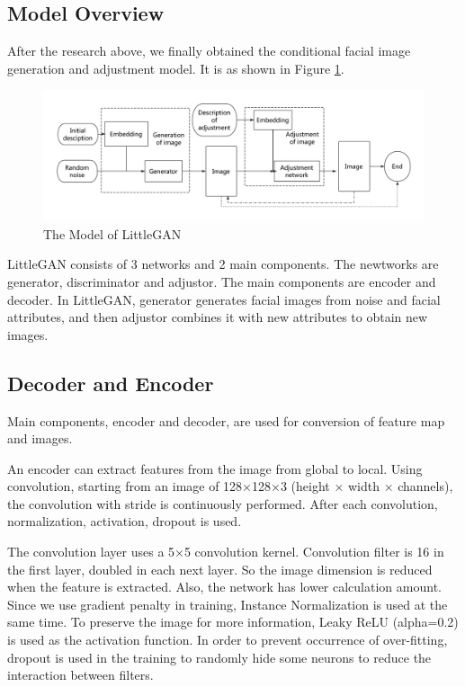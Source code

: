 \subsection{Model Overview}

After the research above, we finally obtained the conditional facial image generation and adjustment model.
It is as shown in Figure \ref{smliegan}.

\begin{figure}
    \begin{center}
    \includegraphics[width=\textwidth]{figures/model.pdf}
    \caption{The Model of LittleGAN}
    \label{smliegan}
    \end{center}
\end{figure}

LittleGAN consists of 3 networks and 2 main components.
The newtworks are generator, discriminator and adjustor.
The main components are encoder and decoder.
In LittleGAN, generator generates facial images from noise and facial attributes,
    and then adjustor combines it with new attributes to obtain new images.


\subsection{Decoder and Encoder}

Main components, encoder and decoder, are used for conversion of feature map and images.

An encoder can extract features from the image from global to local.
Using convolution, starting from an image of 128×128×3 (height × width × channels),
    the convolution with stride is continuously performed.
After each convolution, normalization, activation, dropout is used.

The convolution layer uses a 5×5 convolution kernel.
Convolution filter is 16 in the first layer, doubled in each next layer.
So the image dimension is reduced when the feature is extracted.
Also, the network has lower calculation amount.
Since we use gradient penalty in training,
    Instance Normalization is used at the same time.
To preserve the image for more information, Leaky ReLU (alpha=0.2) is used as the activation function.
In order to prevent occurrence of over-fitting,
    dropout is used in the training to randomly hide some neurons to reduce the interaction between filters.

